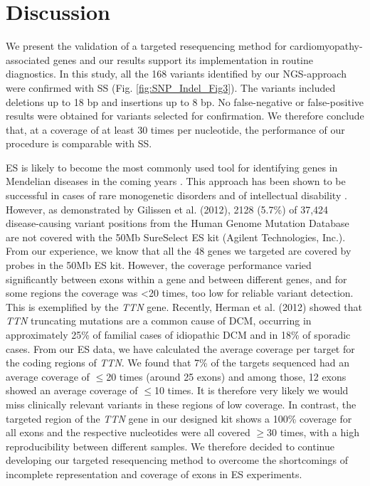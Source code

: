 \section{Discussion}\label{discussion}
We present the validation of a targeted resequencing method for cardiomyopathy-associated genes and our results support its implementation in routine diagnostics. 
In this study, all the 168 variants identified by our NGS-approach were confirmed with SS (Fig.  \ref{fig:SNP_Indel_Fig3}). 
The variants included deletions up to 18 bp and insertions up to 8 bp. 
No false-negative or false-positive results were obtained for variants selected for confirmation. 
We therefore conclude that, at a coverage of at least 30 times per nucleotide, the performance of our procedure is comparable with SS. 

ES is likely to become the most commonly used tool for identifying genes in Mendelian diseases in the coming years \cite{Gilissen_2012}.
This approach has been shown to be successful in cases of rare monogenetic disorders \cite{Gilissen_2010,Hoischen_2010,Ng_2010} and of intellectual disability \cite{Vissers_2010}. 
However, as demonstrated by Gilissen et al. (2012)\cite{Gilissen_2012}, 2128 (5.7\%) of 37,424 disease-causing variant positions from the Human Genome Mutation Database are not covered with the 50Mb SureSelect ES kit (Agilent Technologies, Inc.). 
From our experience, we know that all the 48 genes we targeted are covered by probes in the 50Mb ES kit. 
However, the coverage performance varied significantly between exons within a gene and between different genes, and for some regions the coverage was {\textless}20 times, too low for reliable variant detection. 
This is exemplified by the \textsl{TTN} gene. 
Recently, Herman et al. (2012)\cite{Herman_2012} showed that \textsl{TTN} truncating mutations are a common cause of DCM, occurring in approximately 25\% of familial cases of idiopathic DCM and in 18\% of sporadic cases. 
From our ES data, we have calculated the average coverage per target for the coding regions of \textsl{TTN}. 
We found that 7\% of the targets sequenced had an average coverage of $\le$20 times (around 25 exons) and among those, 12 exons showed an average coverage of $\le$10 times. 
It is therefore very likely we would miss clinically relevant variants in these regions of low coverage. 
In contrast, the targeted region of the \textsl{TTN} gene in our designed kit shows a 100\% coverage for all exons and the respective nucleotides were all covered $\ge$30 times, with a high reproducibility between different samples. 
We therefore decided to continue developing our targeted resequencing method to overcome the shortcomings of incomplete representation and coverage of exons in ES experiments. 

